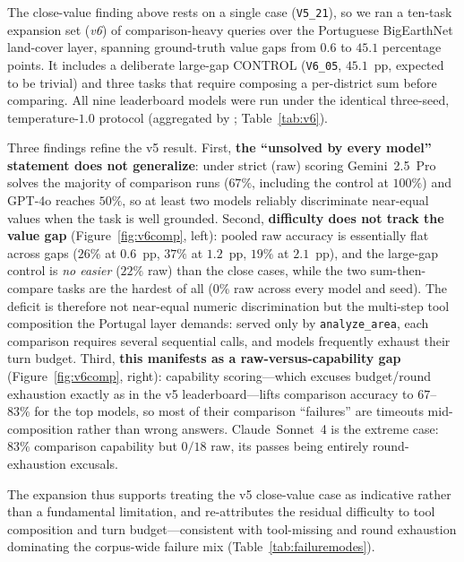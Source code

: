 \documentclass[sigconf]{acmart}
\begin{document}
The close-value finding above rests on a single case (\texttt{V5\_21}), so we ran a ten-task expansion set (\emph{v6}) of comparison-heavy queries over the Portuguese BigEarthNet land-cover layer, spanning ground-truth value gaps from $0.6$ to $45.1$ percentage points. It includes a deliberate large-gap CONTROL (\texttt{V6\_05}, $45.1$~pp, expected to be trivial) and three tasks that require composing a per-district sum before comparing. All nine leaderboard models were run under the identical three-seed, temperature-$1.0$ protocol (aggregated by ; Table~\ref{tab:v6}).

Three findings refine the v5 result. First, \textbf{the ``unsolved by every model'' statement does not generalize}: under strict (raw) scoring Gemini~2.5~Pro solves the majority of comparison runs ($67\%$, including the control at $100\%$) and GPT-4o reaches $50\%$, so at least two models reliably discriminate near-equal values when the task is well grounded. Second, \textbf{difficulty does not track the value gap} (Figure~\ref{fig:v6comp}, left): pooled raw accuracy is essentially flat across gaps ($26\%$ at $0.6$~pp, $37\%$ at $1.2$~pp, $19\%$ at $2.1$~pp), and the large-gap control is \emph{no easier} ($22\%$ raw) than the close cases, while the two sum-then-compare tasks are the hardest of all ($0\%$ raw across every model and seed). The deficit is therefore not near-equal numeric discrimination but the multi-step tool composition the Portugal layer demands: served only by \texttt{analyze\_area}, each comparison requires several sequential calls, and models frequently exhaust their turn budget. Third, \textbf{this manifests as a raw-versus-capability gap} (Figure~\ref{fig:v6comp}, right): capability scoring---which excuses budget/round exhaustion exactly as in the v5 leaderboard---lifts comparison accuracy to $67$--$83\%$ for the top models, so most of their comparison ``failures'' are timeouts mid-composition rather than wrong answers. Claude~Sonnet~4 is the extreme case: $83\%$ comparison capability but $0/18$ raw, its passes being entirely round-exhaustion excusals.

The expansion thus supports treating the v5 close-value case as indicative rather than a fundamental limitation, and re-attributes the residual difficulty to tool composition and turn budget---consistent with tool-missing and round exhaustion dominating the corpus-wide failure mix (Table~\ref{tab:failuremodes}).
\end{document}
